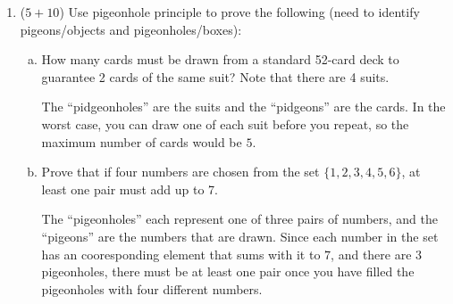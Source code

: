 \documentclass[12pt]{article}
\begin{document}
\begin{enumerate}
			\newpage
		\item ($5 + 10$) Use pigeonhole principle to prove the following (need to identify pigeons/objects and pigeonholes/boxes):

		\begin{enumerate}[a.]
			\item
			How many cards must be drawn from a standard 52-card deck to guarantee 2 cards of the same suit? Note that there are 4 suits.

			The ``pidgeonholes'' are the suits and the ``pidgeons'' are the cards. In the worst case, you can draw one of each suit before you repeat, so the maximum number of cards would be $5$.
			\item
			Prove that if four numbers are chosen from the set $\{1, 2, 3, 4, 5, 6\}$, at least one pair must add up to 7. %

			The ``pigeonholes'' each represent one of three pairs of numbers, and the ``pigeons'' are the numbers that are drawn. Since each number in the set has an cooresponding element that sums with it to $7$, and there are 3 pigeonholes, there must be at least one pair once you have filled the pigeonholes with four different numbers.
		\end{enumerate}

	\end{enumerate}
\end{document}
